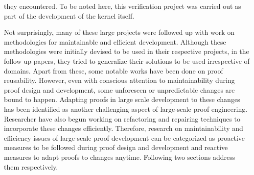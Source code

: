 they encountered. To be noted here, this verification project was carried out as part of the development of the kernel itself. 

Not surprisingly, many of these large projects were followed up with work on methodologies for maintainable and efficient development. Although these methodologies were initially devised to be used in their respective projects, in the follow-up papers, they tried to generalize their solutions to be used irrespective of domains\cite{Curzon_1995, Delaware_et_al_2011, Kaivola_et_al_2003, Woos_et_al_2016}. Apart from these, some notable works have been done on proof reusability. However, even with conscious attention to maintainability during proof design and development, some unforeseen or unpredictable changes are bound to happen. Adapting proofs in large scale development to these changes has been identified as another challenging aspect of large-scale proof engineering. Researcher have also begun working on refactoring and repairing techniques to incorporate these changes efficiently. Therefore, research on maintainability and efficiency issues of large-scale proof development can be categorized as proactive measures to be followed during proof design and development and reactive measures to adapt proofs to changes anytime. Following two sections address them respectively.




